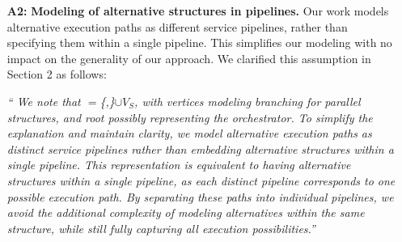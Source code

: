 {\begin{enumerate}
        By incorporating these insights earlier, we aimed to strengthen the rationale behind our assumption and provide better context for its application in this work.

        

        


        \item[\textbf{A2:}] \textbf{Modeling of alternative structures in pipelines.} Our work models alternative execution paths as different service pipelines, rather than specifying them within a single pipeline. This simplifies our modeling with no impact on the generality of our approach. We clarified this assumption in Section 2 as follows:
        
              \vspace{0.5em}
        
              \begin{adjustwidth}{10pt}{10pt}
                  \em``{\color{OurColor}
                  We note that \V$=$\{,\}$\cup$$V_S$, with vertices  modeling branching for parallel structures, and root  possibly representing the orchestrator. To simplify the explanation and maintain clarity, we model alternative execution paths as distinct service pipelines rather than embedding alternative structures within a single pipeline. This representation is equivalent to having alternative structures within a single pipeline, as each distinct pipeline corresponds to one possible execution path. By separating these paths into individual pipelines, we avoid the additional complexity of modeling alternatives within the same structure, while still fully capturing all execution possibilities.}''
                  \vspace{0.5em}
              \end{adjustwidth}
              

\end{enumerate}}
